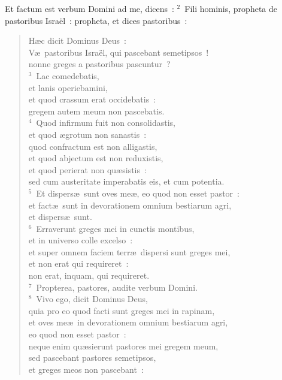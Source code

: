 \lettrine[lines=10,image=true,loversize=0.05,lraise=-0.03]{E}{}t factum est verbum Domini ad me, dicens~:
${}^{2}$~Fili hominis, propheta de pastoribus Isra\"el~: propheta, et dices pastoribus~: \begin{flushleft}\begin{verse}H\ae c dicit Dominus Deus~:\\ V\ae\ pastoribus Isra\"el, qui pascebant semetipsos~!\\ nonne greges a pastoribus pascuntur~?\\
${}^{3}$~Lac comedebatis,\\ et lanis operiebamini,\\ et quod crassum erat occidebatis~:\\ gregem autem meum non pascebatis.\\
${}^{4}$~Quod infirmum fuit non consolidastis,\\ et quod \ae grotum non sanastis~:\\ quod confractum est non alligastis,\\ et quod abjectum est non reduxistis,\\ et quod perierat non qu\ae sistis~:\\ sed cum austeritate imperabatis eis, et cum potentia.\\
${}^{5}$~Et dispers\ae\ sunt oves me\ae , eo quod non esset pastor~:\\ et fact\ae\ sunt in devorationem omnium bestiarum agri,\\ et dispers\ae\ sunt.\\
${}^{6}$~Erraverunt greges mei in cunctis montibus,\\ et in universo colle excelso~:\\ et super omnem faciem terr\ae\ dispersi sunt greges mei,\\ et non erat qui requireret~:\\ non erat, inquam, qui requireret.\\
${}^{7}$~Propterea, pastores, audite verbum Domini.\\
${}^{8}$~Vivo ego, dicit Dominus Deus,\\ quia pro eo quod facti sunt greges mei in rapinam,\\ et oves me\ae\ in devorationem omnium bestiarum agri,\\ eo quod non esset pastor~:\\ neque enim qu\ae sierunt pastores mei gregem meum,\\ sed pascebant pastores semetipsos,\\ et greges meos non pascebant~:\\

\end{verse}
\end{flushleft}
